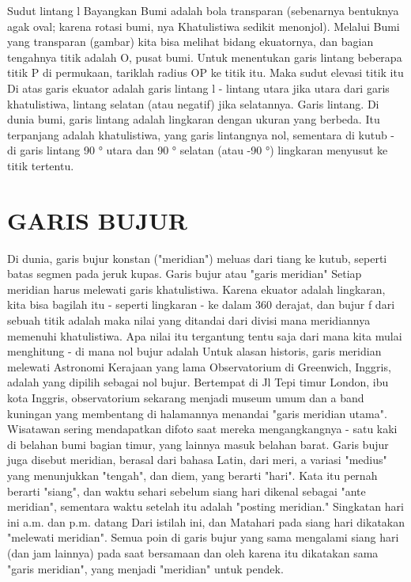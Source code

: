 	Sudut lintang l
	Bayangkan Bumi adalah bola transparan (sebenarnya
	bentuknya agak oval; karena rotasi bumi, nya
	Khatulistiwa sedikit menonjol). Melalui Bumi yang transparan
	(gambar) kita bisa melihat bidang ekuatornya, dan bagian tengahnya
	titik adalah O, pusat bumi.
	Untuk menentukan garis lintang beberapa titik P di permukaan, tariklah
	radius OP ke titik itu. Maka sudut elevasi titik itu
	Di atas garis ekuator adalah garis lintang l - lintang utara jika utara
	dari garis khatulistiwa, lintang selatan (atau negatif) jika selatannya.
	Garis lintang. Di dunia bumi, garis lintang adalah lingkaran dengan ukuran yang berbeda. Itu
	terpanjang adalah khatulistiwa, yang garis lintangnya nol, sementara di kutub - di garis lintang
	90 ° utara dan 90 ° selatan (atau -90 °) lingkaran menyusut ke titik tertentu.

\section{GARIS BUJUR}
	Di dunia, garis bujur konstan ("meridian") meluas dari tiang ke kutub, seperti
	batas segmen pada jeruk kupas.
	Garis bujur atau "garis meridian"
	Setiap meridian harus melewati garis khatulistiwa. Karena ekuator adalah lingkaran, kita bisa
	bagilah itu - seperti lingkaran - ke dalam 360 derajat, dan bujur f dari sebuah titik adalah
	maka nilai yang ditandai dari divisi mana meridiannya memenuhi khatulistiwa.
	Apa nilai itu tergantung tentu saja dari mana kita mulai menghitung - di mana
	nol bujur adalah Untuk alasan historis, garis meridian melewati Astronomi Kerajaan yang lama
	Observatorium di Greenwich, Inggris, adalah yang dipilih sebagai nol bujur. Bertempat di Jl
	Tepi timur London, ibu kota Inggris, observatorium sekarang menjadi museum umum dan a
	band kuningan yang membentang di halamannya menandai "garis meridian utama". Wisatawan sering mendapatkan
	difoto saat mereka mengangkangnya - satu kaki di belahan bumi bagian timur, yang lainnya masuk belahan barat.
	Garis bujur juga disebut meridian, berasal dari bahasa Latin, dari meri, a
	variasi "medius" yang menunjukkan "tengah", dan diem, yang berarti "hari". Kata itu
	pernah berarti "siang", dan waktu sehari sebelum siang hari dikenal sebagai "ante meridian",
	sementara waktu setelah itu adalah "posting meridian." Singkatan hari ini a.m. dan p.m. datang
	Dari istilah ini, dan Matahari pada siang hari dikatakan "melewati meridian". Semua poin di
	garis bujur yang sama mengalami siang hari (dan jam lainnya) pada saat bersamaan dan
	oleh karena itu dikatakan sama "garis meridian", yang menjadi "meridian" untuk
	pendek.

